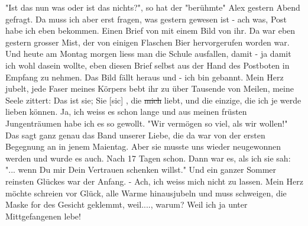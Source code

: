 \def\day{18. Oktober 1943.}
\mktitle

"Ist das nun was oder ist das nichts?", so hat der "ber\"{u}hmte" Alex gestern Abend gefragt.
Da muss ich aber erst fragen, was gestern gewesen ist - ach was, Post habe ich eben bekommen.
Einen Brief von mit einem Bild von ihr.
Da war eben gestern grosser Mist, der von einigen Flaschen Bier hervorgerufen worden war.
Und heute am Montag morgen liess man die Schule ausfallen, damit - ja damit ich wohl dasein wollte, eben diesen Brief selbst aus der Hand des Postboten in Empfang zu nehmen.
Das Bild f\"{a}llt heraus und - ich bin gebannt.
Mein Herz jubelt, jede Faser meines K\"{o}rpers bebt ihr zu \"{u}ber Tausende von Meilen, meine Seele zittert: Das ist sie; Sie{\color{red} [sic] }, die \st{mich} liebt, und die einzige, die ich je werde lieben k\"{o}nnen.
Ja, ich weiss es schon lange und aus meinen fr\"{u}sten Jungentr\"{a}umen habe ich es so gewollt.
"Wir verm\"{o}gen so viel, als wir wollen!"
Das sagt ganz genau das Band unserer Liebe, die da war von der ersten Begegnung an in jenem Maientag.
Aber sie musste uns wieder neugewonnen werden und wurde es auch.
Nach 17 Tagen schon.
Dann war es, als ich sie sah: "... wenn Du mir Dein Vertrauen schenken willst."
Und ein ganzer Sommer reinsten Gl\"{u}ckes war der Anfang.
- Ach, ich weiss mich nicht zu lassen.
Mein Herz m\"{o}chte schreien vor Gl\"{u}ck, alle Warme hinausjubeln und muss schweigen, die Maske for des Gesicht geklemmt, weil...., warum?
Weil ich ja unter Mittgefangenen lebe!

\clearpage
